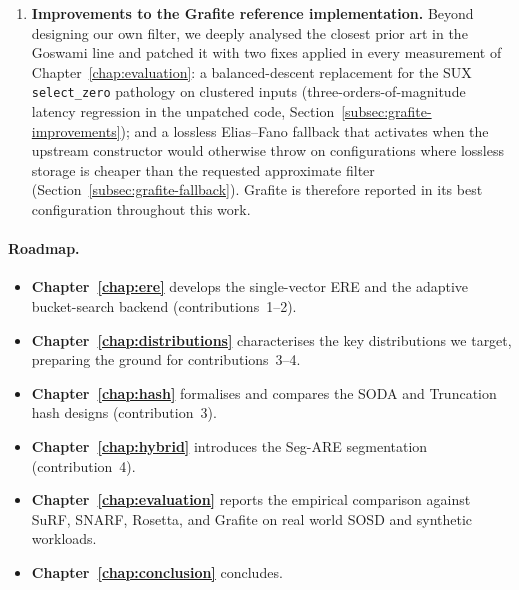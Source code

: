 \begin{enumerate}
    \item \textbf{Improvements to the Grafite reference implementation.}
    Beyond designing our own filter, we deeply analysed the closest
    prior art in the Goswami line and patched it with two
    fixes applied in every measurement of
    Chapter~\ref{chap:evaluation}: a balanced-descent replacement for
    the SUX \texttt{select\_zero} pathology on clustered inputs
    (three-orders-of-magnitude latency regression in the unpatched
    code, Section~\ref{subsec:grafite-improvements}); and a lossless
    Elias--Fano fallback that activates when the upstream constructor
    would otherwise throw on configurations where lossless storage is
    cheaper than the requested approximate filter
    (Section~\ref{subsec:grafite-fallback}). Grafite is therefore
    reported in its best configuration throughout this work.
\end{enumerate}

\paragraph{Roadmap.}
\begin{itemize}
    \item \textbf{Chapter~\ref{chap:ere}} develops the single-vector
        ERE and the adaptive bucket-search backend
        (contributions~1--2).
    \item \textbf{Chapter~\ref{chap:distributions}} characterises the
        key distributions we target, preparing the ground for
        contributions~3--4.
    \item \textbf{Chapter~\ref{chap:hash}} formalises and compares the
        SODA and Truncation hash designs (contribution~3).
    \item \textbf{Chapter~\ref{chap:hybrid}} introduces the Seg-ARE
        segmentation (contribution~4).
    \item \textbf{Chapter~\ref{chap:evaluation}} reports the empirical
        comparison against SuRF, SNARF, Rosetta, and Grafite on real world SOSD
        and synthetic workloads.
    \item \textbf{Chapter~\ref{chap:conclusion}} concludes.
\end{itemize}
